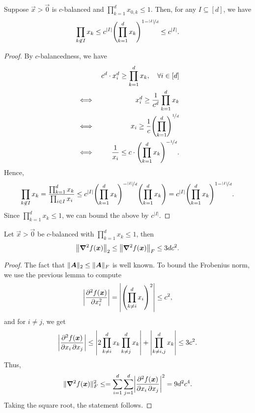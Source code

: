 \begin{lemma}
    Suppose $\vec{x} > \vec{0}$ is $c$-balanced and $\prod_{k=1}^d x_{0,k} \leq 1$. Then, for any $I \subseteq [d]$, we have \[
        \prod_{k \not\in I} x_k \leq c^{|I|} \lft( \prod_{k=1}^d x_k \rgt)^{1- \nicefrac{|I|}{d}} \leq c^{|I|}.
    \]
\end{lemma}

\begin{proof}
    By $c$-balancedness, we have
    \begin{align*}
         &      & c^d \cdot x_i^d \geq \prod_{k=1}^d x_k, \quad \forall i \in [d]                \\
         & \iff & x_i^d \geq \frac{1}{c^d} \prod_{k=1}^d x_k                                     \\
         & \iff & x_i \geq \frac{1}{c} \lft( \prod_{k=1}^d \rgt)^{\nicefrac{1}{d}}               \\
         & \iff & \frac{1}{x_i} \leq c \cdot \lft( \prod_{k=1}^{d} x_k \rgt)^{-\nicefrac{1}{d}}.
    \end{align*}
    Hence, \[
        \prod_{k \not\in I} x_k = \frac{\prod_{k=1}^d x_k}{\prod_{i \in I} x_i} \leq c^{|I|} \lft( \prod_{k=1}^{d} x_k \rgt)^{-\nicefrac{|I|}{d}} \lft( \prod_{k=1}^{d} x_k \rgt) = c^{|I|} \lft( \prod_{k=1}^{d} x_k \rgt)^{1-\nicefrac{|I|}{d}}.
    \]
    Since $\prod_{k=1}^d x_k \leq 1$, we can bound the above by $c^{|I|}$.
\end{proof}

\begin{lemma}
    Let $\vec{x} > \vec{0}$ be $c$-balanced with $\prod_{k=1}^d x_k \leq 1$, then \[
        \lft\| \hess{f(\vec{x})}{} \rgt\|_2 \leq \lft\| \hess{f(\vec{x})}{} \rgt\|_F \leq 3 d c^2.
    \]
\end{lemma}

\begin{proof}
    The fact that $\| \bm{A} \|_2 \leq \| \bm{A} \|_F$ is well known. To bound the Frobenius norm, we
    use the previous lemma to compute \[
        \lft|\pdv[order=2]{f(\vec{x})}{x_i}\rgt| = \lft| \lft( \prod_{k \neq i}^d x_i \rgt)^2 \rgt| \leq c^2,
    \]
    and for $i \neq j$, we get \[
        \lft| \pdv{f(\vec{x})}{x_i,x_j} \rgt| \leq \lft| 2 \prod_{k \neq i}^d x_k \prod_{k \neq j}^d x_k \rgt| + \lft| \prod_{k\neq i,j}^d x_k \rgt| \leq 3c^2.
    \]
    Thus, \[
        \| \hess{f(\vec{x})}{} \|_F^2 \leq = \sum_{i=1}^{d} \sum_{j=1}^{d} \lft| \pdv{f(\vec{x})}{x_i, x_j} \rgt|^2 = 9d^2 c^4.
    \]
    Taking the square root, the statement follows.
\end{proof}

